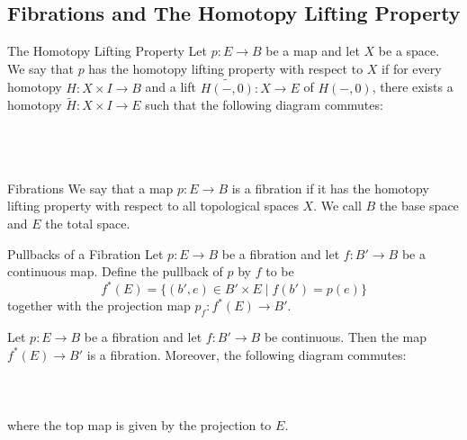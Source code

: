 \documentclass[a4paper]{article}
\begin{document}
\subsection{Fibrations and The Homotopy Lifting Property}
\begin{defn}{The Homotopy Lifting Property}{} Let $p:E\to B$ be a map and let $X$ be a space. We say that $p$ has the homotopy lifting property with respect to $X$ if for every homotopy $H:X\times I\to B$ and a lift $\widetilde{H(-,0)}:X\to E$ of $H(-,0)$, there exists a homotopy $\widetilde{H}:X\times I\to E$ such that the following diagram commutes: \\~\\
\\~\\
\end{defn}

\begin{defn}{Fibrations}{} We say that a map $p:E\to B$ is a fibration if it has the homotopy lifting property with respect to all topological spaces $X$. We call $B$ the base space and $E$ the total space. 
\end{defn}

\begin{defn}{Pullbacks of a Fibration}{} Let $p:E\to B$ be a fibration and let $f:B'\to B$ be a continuous map. Define the pullback of $p$ by $f$ to be $$f^\ast(E)=\{(b',e)\in B'\times E\;|\;f(b')=p(e)\}$$ together with the projection map $p_f:f^\ast(E)\to B'$. 
\end{defn}

\begin{prp}{}{} Let $p:E\to B$ be a fibration and let $f:B'\to B$ be continuous. Then the map $f^\ast(E)\to B'$ is a fibration. Moreover, the following diagram commutes: \\~\\
\\~\\
where the top map is given by the projection to $E$. 
\end{prp}
\end{document}

